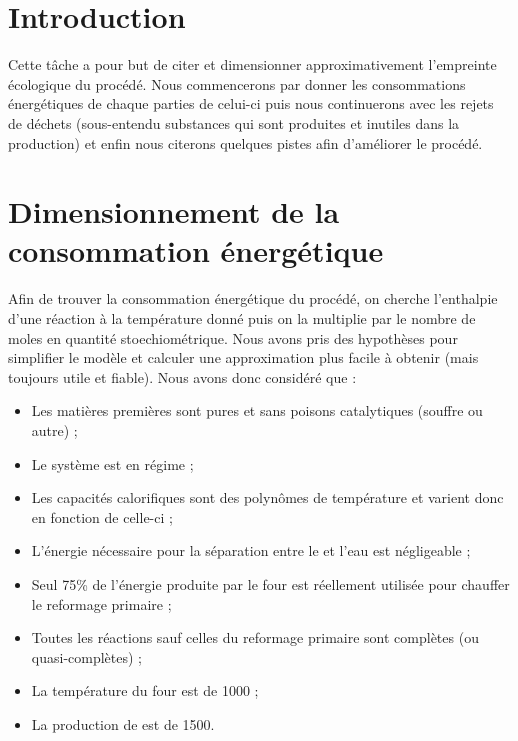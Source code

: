 
\section{Introduction}
Cette tâche a pour but de citer et dimensionner approximativement 
l'empreinte écologique du procédé. Nous commencerons par donner les
consommations énergétiques de chaque parties de celui-ci puis nous
continuerons avec les rejets de déchets (sous-entendu substances qui
sont produites et inutiles dans la production) et enfin nous citerons
quelques pistes afin d'améliorer le procédé.

\section{Dimensionnement de la consommation énergétique}
\label{sec:dim}
Afin de trouver la consommation énergétique du procédé, on cherche l'enthalpie
d'une réaction à la température donné puis on la multiplie par le nombre de 
moles en quantité stoechiométrique. Nous avons pris des hypothèses pour simplifier
le modèle et calculer une approximation plus facile à obtenir (mais toujours utile
et fiable). Nous avons donc considéré que :
\begin{itemize}
	\item Les matières premières sont pures et sans poisons catalytiques (souffre ou autre) ;
	\item Le système est en régime ; 
  \item Les capacités calorifiques sont des polynômes de température et 
	varient donc en fonction de celle-ci ;
	\item L'énergie nécessaire pour la séparation entre le  et 
	l'eau est négligeable ;
	\item Seul 75\% de l'énergie produite par le four est réellement utilisée pour 
	chauffer le reformage primaire ;
	\item Toutes les réactions sauf celles du reformage primaire sont complètes 
	(ou quasi-complètes) ;
	\item La température du four est de \unit{1000}{\kelvin} ;
	\item La production de  est de \unit{1500}{\ton\per\dday}.
\end{itemize}
	

